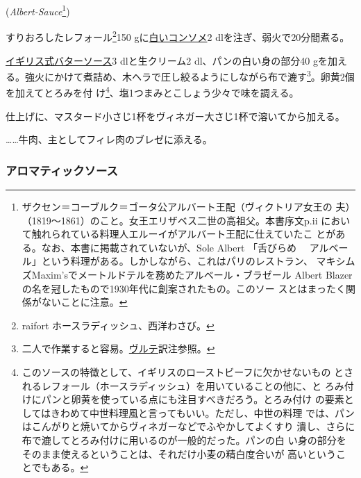 \begin{recette}
\hspace{1em}(\emph{Albert-Sauce}\footnote{ザクセン＝コーブルク＝ゴータ公アルバート王配（ヴィクトリア女王の
  夫）（1819〜1861）のこと。女王エリザベス二世の高祖父。本書序文p.ii
  において触れられている料理人エルーイがアルバート王配に仕えていたこ
  とがある。なお、本書に掲載されていないが、Sole Albert 「舌びらめ　
  アルベール」という料理がある。しかしながら、これはパリのレストラン、
  マキシムズMaxim'sでメートルドテルを務めたアルベール・ブラゼール Albert
  Blazerの名を冠したもので1930年代に創案されたもの。このソー
  スとはまったく関係がないことに注意。})


すりおろしたレフォール\footnote{raifort ホースラディッシュ、西洋わさび。}150
gに\protect\hyperlink{}{白いコンソメ}2 dlを注ぎ、弱火で20分間煮る。

\protect\hyperlink{butter-sauce}{イギリス式バターソース}3
dlと生クリーム2\undemi{} dl、パンの白い身の部分40
gを加える。強火にかけて煮詰め、木ヘラで圧し絞るようにしながら布で漉す\footnote{二人で作業すると容易。\protect\hyperlink{veloute}{ヴルテ}訳注参照。}。卵黄2個を加えてとろみを付
け\footnote{このソースの特徴として、イギリスのローストビーフに欠かせないもの
  とされるレフォール（ホースラディッシュ）を用いていることの他に、と
  ろみ付けにパンと卵黄を使っている点にも注目すべきだろう。とろみ付け
  の要素としてはきわめて中世料理風と言ってもいい。ただし、中世の料理
  では、パンはこんがりと焼いてからヴィネガーなどでふやかしてよくすり
  潰し、さらに布で漉してとろみ付けに用いるのが一般的だった。パンの白
  い身の部分をそのまま使えるということは、それだけ小麦の精白度合いが
  高いということでもある。}、塩1つまみとこしょう少々で味を調える。

仕上げに、マスタード小さじ1杯をヴィネガー大さじ1杯で溶いてから加える。

\ldots{}\ldots{}牛肉、主としてフィレ肉のブレゼに添える。

\maeaki

\hypertarget{aromatic-sauce}{%
\subsubsection{アロマティックソース}\label{aromatic-sauce}}


\end{recette}
